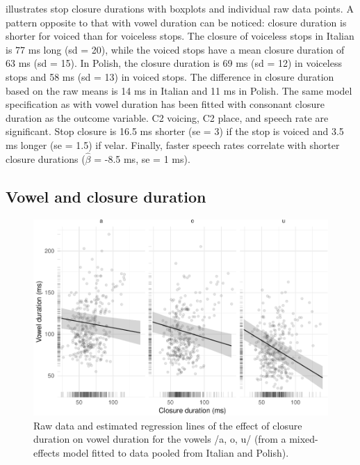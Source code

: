 \documentclass[preprint]{JASAnew}
\begin{document}
 illustrates stop closure durations with boxplots
and individual raw data points. A pattern opposite to that with vowel
duration can be noticed: closure duration is shorter for voiced than for
voiceless stops. The closure of voiceless stops in Italian is 77 ms long
(sd = 20), while the voiced stops have a mean closure duration of 63 ms
(sd = 15). In Polish, the closure duration is 69 ms (sd = 12) in
voiceless stops and 58 ms (sd = 13) in voiced stops. The difference in
closure duration based on the raw means is 14 ms in Italian and 11 ms in
Polish. The same model specification as with vowel duration has been
fitted with consonant closure duration as the outcome variable. C2
voicing, C2 place, and speech rate are significant. Stop closure is 16.5
ms shorter (se = 3) if the stop is voiced and 3.5 ms longer (se = 1.5)
if velar. Finally, faster speech rates correlate with shorter closure
durations (\(\hat{\beta}\) = -8.5 ms, se = 1 ms).

\hypertarget{vowel-and-closure-duration}{%
\subsection{Vowel and closure
duration}\label{vowel-and-closure-duration}}

\begin{figure}
\includegraphics[width=\linewidth]{2018-jasa_files/figure-latex/vow-clo-plot-1} \caption{Raw data and estimated regression lines of the effect of closure duration on vowel duration for the vowels /a, o, u/ (from a mixed-effects model fitted to data pooled from Italian and Polish).}\label{f:vow-clo-plot}
\end{figure}
\end{document}
